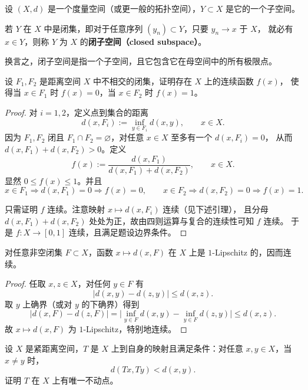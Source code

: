 \begin{definition}[闭子空间]
设 $(X,d)$ 是一个度量空间（或更一般的拓扑空间），$Y\subset X$ 是它的一个子空间。

若 $Y$ 在 $X$ 中是闭集，即对于任意序列 $(y_n)\subset Y$，只要 $y_n\to x$ 于 $X$，
就必有 $x\in Y$，则称 $Y$ 为 $X$ 的\textbf{闭子空间（closed subspace）}。

换言之，闭子空间是指一个子空间，且它包含它在母空间中的所有极限点。
\end{definition}

\begin{homework}[第 13 题]
设 $F_1, F_2$ 是距离空间 $X$ 中不相交的闭集，证明存在 $X$ 上的连续函数 $f(x)$，
使得当 $x \in F_1$ 时 $f(x)=0$，当 $x \in F_2$ 时 $f(x)=1$。
\end{homework}

\begin{proof}
对 $i=1,2$，定义点到集合的距离
\[
d(x,F_i):=\inf_{y\in F_i} d(x,y),\qquad x\in X.
\]
因为 $F_1,F_2$ 闭且 $F_1\cap F_2=\varnothing$，对任意 $x\in X$ 至多有一个 $d(x,F_i)=0$，
从而 $d(x,F_1)+d(x,F_2)>0$。定义
\[
f(x):=\frac{d(x,F_1)}{d(x,F_1)+d(x,F_2)},\qquad x\in X.
\]
显然 $0\le f(x)\le 1$。并且
\[
x\in F_1 \Rightarrow d(x,F_1)=0 \Rightarrow f(x)=0,\qquad
x\in F_2 \Rightarrow d(x,F_2)=0 \Rightarrow f(x)=1.
\]

只需证明 $f$ 连续。注意映射 $x\mapsto d(x,F_i)$ 连续（见下述引理），
且分母 $d(x,F_1)+d(x,F_2)$ 处处为正，故由四则运算与复合的连续性可知 $f$ 连续。
于是 $f:X\to[0,1]$ 连续，且满足题设边界条件。
\end{proof}

\begin{lemma}
对任意非空闭集 $F\subset X$，函数 $x\mapsto d(x,F)$ 在 $X$ 上是 $1$-Lipschitz 的，因而连续。
\end{lemma}

\begin{proof}
任取 $x,z\in X$，对任何 $y\in F$ 有
\[
\big|d(x,y)-d(z,y)\big|\le d(x,z).
\]
取 $y$ 上确界（或对 $y$ 的下确界）得到
\[
\big|d(x,F)-d(z,F)\big|
=\big|\inf_{y\in F} d(x,y)-\inf_{y\in F} d(z,y)\big|
\le d(x,z).
\]
故 $x\mapsto d(x,F)$ 为 $1$-Lipschitz，特别地连续。
\end{proof}

\begin{homework}[第 20 题]
设 $X$ 是紧距离空间，$T$ 是 $X$ 上到自身的映射且满足条件：对任意 $x,y \in X$，当 $x\neq y$ 时，
\[
d(Tx,Ty) < d(x,y).
\]
证明 $T$ 在 $X$ 上有唯一不动点。
\end{homework}

